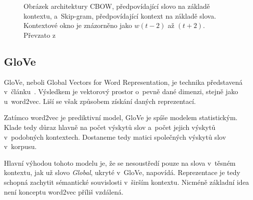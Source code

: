 \begin{figure}[hbt]
	\centering
	\caption{Obrázek architektury CBOW, předpovídající slovo na základě kontextu, a~Skip-gram, předpovídající kontext na základě slova. Kontextové okno je znázorněno jako $w(t-2)$ až $(t+2)$. Převzato z \cite{mikolov2013embeddings}}
	\label{cbow_and_skipgram}
\end{figure}


\subsection{GloVe}

GloVe, neboli Global Vectors for Word Representation, je technika představená v~člán\-ku~\cite{GloVe}. Výsledkem je vektorový prostor o~pevně dané dimenzi, stejně jako u~word2vec. Liší se však způsobem získání daných reprezentací.\par Zatímco word2vec je prediktivní model, GloVe je spíše modelem statistickým. Klade tedy důraz hlavně na počet výskytů slov a~počet jejich výskytů v~podobných kontextech. Dostaneme tedy matici společných výskytů slov v~korpusu.\par
Hlavní výhodou tohoto modelu je, že se nesoustředí pouze na slova v~těsném kontextu, jak už slovo \emph{Global}, ukryté v~GloVe, napovídá. Reprezentace je tedy schopná zachytit sémantické souvislosti v~širším kontextu. Nicméně základní idea není konceptu word2vec příliš vzdálená.


